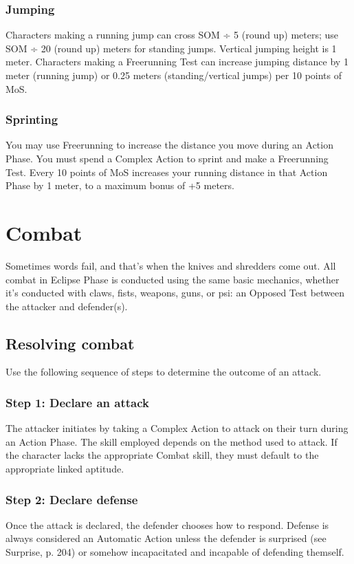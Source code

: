 \subsubsection{Jumping} Characters making a running jump can cross SOM ÷ 5 (round up) meters; use SOM ÷ 20 (round up) meters for standing jumps. Vertical jumping height is 1 meter. Characters making a Freerunning Test can increase jumping distance by 1 meter (running jump) or 0.25 meters (standing/vertical jumps) per 10 points of MoS.

\subsubsection{Sprinting} You may use Freerunning to increase the distance you move during an Action Phase. You must spend a Complex Action to sprint and make a Freerunning Test. Every 10 points of MoS increases your running distance in that Action Phase by 1 meter, to a maximum bonus of +5 meters.


\section{Combat}
\label{sec:combat}

Sometimes words fail, and that’s when the knives and shredders come out. All combat in Eclipse Phase is conducted using the same basic mechanics, whether it’s conducted with claws, fists, weapons, guns, or psi: an Opposed Test between the attacker and defender(s).

\subsection{Resolving combat}

Use the following sequence of steps to determine the outcome of an attack.

\subsubsection{Step 1: Declare an attack} The attacker initiates by taking a Complex Action to attack on their turn during an Action Phase. The skill employed depends on the method used to attack. If the character lacks the appropriate Combat skill, they must default to the appropriate linked aptitude.

\subsubsection{Step 2: Declare defense} Once the attack is declared, the defender chooses how to respond. Defense is always considered an Automatic Action unless the defender is surprised (see Surprise, p. 204) or somehow incapacitated and incapable of defending themself.

